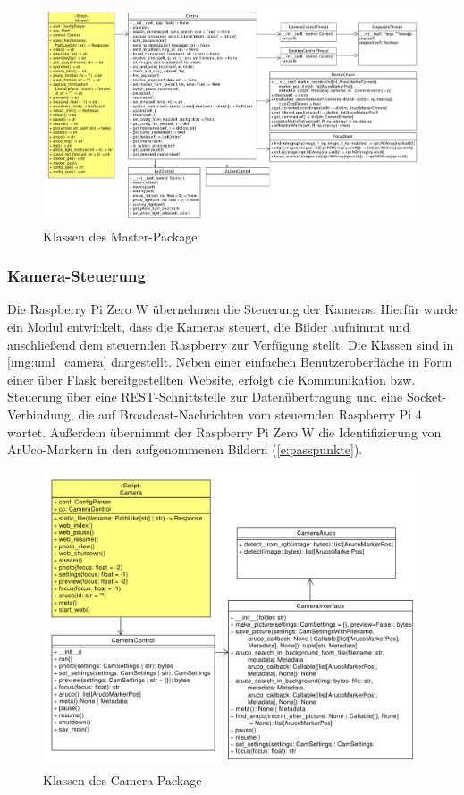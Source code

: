 \documentclass[./00PhotoBox.tex]{subfiles}
\begin{document}
\begin{figure}
  \centering
  \includegraphics[width=1\textwidth]{./img/uml/uml_master_classdiagramm.pdf}
  \caption{Klassen des Master-Package} %
  \label{img:master} %
\end{figure}


\subsubsection{Kamera-Steuerung}
Die Raspberry Pi Zero W übernehmen die Steuerung der Kameras. Hierfür wurde ein Modul entwickelt, dass die Kameras steuert, die Bilder aufnimmt und anschließend dem steuernden Raspberry zur Verfügung stellt. Die Klassen sind in \autoref{img:uml_camera} dargestellt. Neben einer einfachen Benutzeroberfläche in Form einer über Flask bereitgestellten Website, erfolgt die Kommunikation bzw. Steuerung über eine REST-Schnittstelle zur Datenübertragung und eine Socket-Verbindung, die auf Broadcast-Nachrichten vom steuernden Raspberry Pi 4 wartet. Außerdem übernimmt der Raspberry Pi Zero W die Identifizierung von ArUco-Markern in den aufgenommenen Bildern (\autoref{e:passpunkte}).


\begin{figure}
  \centering
  \includegraphics[width=1\textwidth]{./img/uml/uml_camera_classdiagramm.pdf}
  \caption{Klassen des Camera-Package} %
  \label{img:uml_camera} %
\end{figure}
\end{document}
